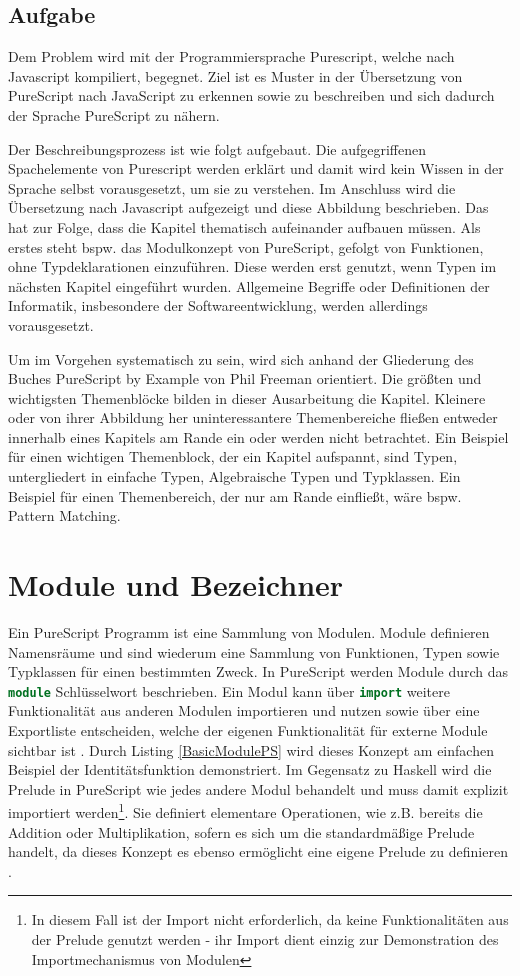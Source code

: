 \documentclass[
12pt,
ngerman,
oneside]
{scrbook} %
\begin{document}
\section{Aufgabe}
Dem Problem wird mit der Programmiersprache Purescript, welche nach Javascript kompiliert, begegnet. Ziel ist es Muster in der Übersetzung von PureScript nach JavaScript zu erkennen sowie zu beschreiben und sich dadurch der Sprache PureScript zu nähern.

Der Beschreibungsprozess ist wie folgt aufgebaut. Die aufgegriffenen Spachelemente von Purescript werden erklärt und damit wird kein Wissen in der Sprache selbst vorausgesetzt, um sie zu verstehen. Im Anschluss wird die Übersetzung nach Javascript aufgezeigt und diese Abbildung beschrieben. Das hat zur Folge, dass die Kapitel thematisch aufeinander aufbauen müssen. Als erstes steht bspw. das Modulkonzept von PureScript, gefolgt von Funktionen, ohne Typdeklarationen einzuführen. Diese werden erst genutzt, wenn Typen im nächsten Kapitel eingeführt wurden. Allgemeine Begriffe oder Definitionen der Informatik, insbesondere der Softwareentwicklung, werden allerdings vorausgesetzt.

Um im Vorgehen systematisch zu sein, wird sich anhand der Gliederung des Buches \glqq PureScript by Example\grqq{} von Phil Freeman orientiert. Die größten und wichtigsten Themenblöcke bilden in dieser Ausarbeitung die Kapitel. Kleinere oder von ihrer Abbildung her uninteressantere Themenbereiche fließen entweder innerhalb eines Kapitels am Rande ein oder werden nicht betrachtet. Ein Beispiel für einen wichtigen Themenblock, der ein Kapitel aufspannt, sind Typen, untergliedert in einfache Typen, Algebraische Typen und Typklassen. Ein Beispiel für einen Themenbereich, der nur am Rande einfließt, wäre bspw. Pattern Matching.


\chapter{Module und Bezeichner}
Ein PureScript Programm ist eine Sammlung von Modulen. Module definieren Namensräume und sind wiederum eine Sammlung von Funktionen, Typen sowie Typklassen für einen bestimmten Zweck. In PureScript werden Module durch das \lstinline[language=purescript, columns=fixed]{module} Schlüsselwort beschrieben. Ein Modul kann über \lstinline[language=purescript, columns=fixed]{import} weitere Funktionalität aus anderen Modulen importieren und nutzen sowie über eine Exportliste entscheiden, welche der eigenen Funktionalität für externe Module sichtbar ist \cite{PSModules18}. Durch Listing \ref{BasicModulePS} wird dieses Konzept am einfachen Beispiel der Identitätsfunktion demonstriert. Im Gegensatz zu Haskell wird die Prelude in PureScript wie jedes andere Modul behandelt und muss damit explizit importiert werden\footnote{In diesem Fall ist der Import nicht erforderlich, da keine Funktionalitäten aus der Prelude genutzt werden - ihr Import dient einzig zur Demonstration des Importmechanismus von Modulen}. Sie definiert elementare Operationen, wie z.B. bereits die Addition oder Multiplikation, sofern es sich um die standardmäßige Prelude handelt, da dieses Konzept es ebenso ermöglicht eine eigene Prelude zu definieren \cite{PSDifferences-from-Haskell18}.
\end{document}
